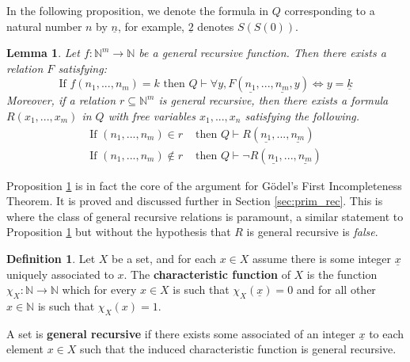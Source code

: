 \documentclass[12pt]{article}
\theoremstyle{plain}
\newtheorem{lemma}[thm]{Lemma}
\theoremstyle{definition}
\newtheorem{defn}[thm]{Definition} %
\newcommand{\bb}[1]{\mathbb{#1}}
\newcommand{\lto}{\longrightarrow}
\begin{document}
	In the following proposition, we denote the formula in $Q$ corresponding to a natural number $n$ by $\underline{n}$, for example, $\underline{2}$ denotes $S(S(0))$.
	\begin{lemma}\label{lem:strongly_representable}
		Let $f: \bb{N}^m \lto \bb{N}$ be a general recursive function. Then there exists a relation $F$ satisfying:
		\begin{equation}
			\text{If }f(n_1,...,n_m) = k \text{ then }Q\vdash \forall y, F(\underline{n_1},...,\underline{n_m},y)\Longleftrightarrow y = \underline{k}
		\end{equation}
	Moreover, if a relation $r \subseteq \bb{N}^m$ is general recursive, then there exists a formula $R(x_1,...,x_m)$ in $Q$ with free variables $x_1,...,x_n$ satisfying the following.
	\begin{align*}
		\text{If }(n_1,...,n_m) \in r &\text{ then }Q\vdash R(\underline{n_1},...,\underline{n_m})\\
		\text{If }(n_1,...,n_m) \not\in r &\text{ then }Q\vdash\neg R(\underline{n_1},...,\underline{n_m})
	\end{align*}
	\end{lemma}
	Proposition \ref{lem:strongly_representable} is in fact the core of the argument for G\"{o}del's First Incompleteness Theorem. It is proved and discussed further in Section \ref{sec:prim_rec}. This is where the class of general recursive relations is paramount, a similar statement to Proposition \ref{lem:strongly_representable} but without the hypothesis that $R$ is general recursive is \emph{false}.
	
	\begin{defn}
		Let $X$ be a set, and for each $x \in X$ assume there is some integer $\underline{x}$ uniquely associated to $x$. The \textbf{characteristic function} of $X$ is the function $\chi_X: \bb{N} \lto \bb{N}$ which for every $x \in X$ is such that $\chi_X(\underline{x}) = 0$ and for all other $x \in \bb{N}$ is such that $\chi_X(x) = 1$.
		
		A set is \textbf{general recursive} if there exists some associated of an integer $\underline{x}$ to each element $x \in X$ such that the induced characteristic function is general recursive.
		\end{defn}
	
\end{document}
